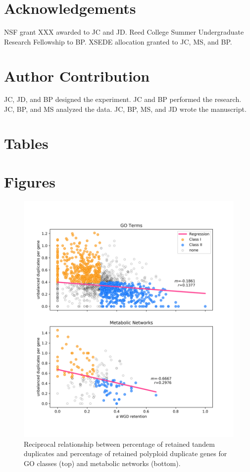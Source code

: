 \documentclass[11pt]{article}
\begin{document}
\section*{Acknowledgements}
NSF grant XXX awarded to JC and JD. Reed College Summer Undergraduate Research Fellowship to BP. XSEDE allocation granted to JC, MS, and BP.

\section*{Author Contribution}
JC, JD, and BP designed the experiment. JC and BP performed the research. JC, BP, and MS analyzed the data. JC, BP, MS, and JD wrote the manuscript. 




\clearpage

\section*{Tables}

\section*{Figures}

\begin{figure}[h!]
    \includegraphics[width=\linewidth]{../figures/dup_history_GO_and_MN.png}
 \caption{Reciprocal relationship between percentage of retained tandem duplicates and percentage of retained polyploid duplicate genes for GO classes (top) and metabolic networks (bottom).}
  \label{fig1}
\end{figure}
\end{document}
